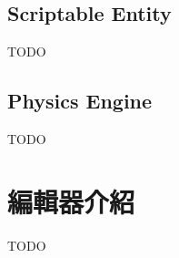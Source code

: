 
\subsection{Scriptable Entity} %
\label{sub:Scriptable Entity}
TODO

\subsection{Physics Engine} %
\label{sub:Physics Engine}
TODO

\section{編輯器介紹}

TODO

\newpage